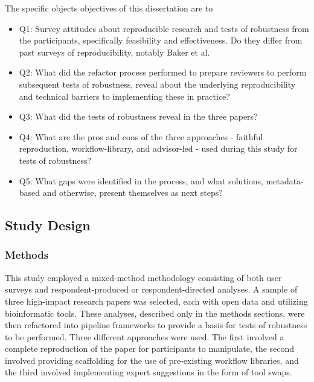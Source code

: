 \documentclass{drexelthesis}
\begin{document}
The specific objects objectives of this dissertation are to 

\begin{itemize}
	\item Q1: Survey attitudes about reproducible research and tests of robustness from the participants, specifically feasibility and effectiveness. Do they differ from past surveys of reproducibility, notably Baker et al. \cite{Baker2016-ri} 

	\item Q2: What did the refactor process performed to prepare reviewers to perform subsequent tests of robustness, reveal about the underlying reproducibility and technical barriers to implementing these in practice?

	\item Q3: What did the tests of robustness reveal in the three papers?

	\item Q4: What are the pros and cons of the three approaches - faithful reproduction, workflow-library, and advisor-led - used during this study for tests of robustness?

	\item Q5: What gaps were identified in the process, and what solutions, metadata-based and otherwise, present themselves as next steps?

\end{itemize}
\subsection{Study Design}

\subsubsection{Methods}

This study employed a mixed-method methodology consisting of both user surveys and respondent-produced or respondent-directed analyses. A sample of three high-impact research papers was selected, each with open data and utilizing bioinformatic tools. These analyses, described only in the methods sections, were then refactored into pipeline frameworks to provide a basis for tests of robustness to be performed. Three different approaches were used. The first involved a complete reproduction of the paper for participants to manipulate, the second involved providing scaffolding for the use of pre-existing workflow libraries, and the third involved implementing expert suggestions in the form of tool swaps.
\end{document}
